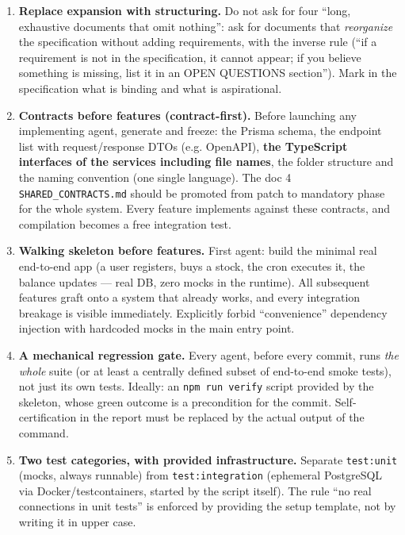 \documentclass[11pt,a4paper]{article}
\newcommand{\file}[1]{\texttt{\small #1}}
\begin{document}
\begin{enumerate}[leftmargin=1.8em]
  \item \textbf{Replace expansion with structuring.} Do not ask for four ``long, exhaustive documents that omit nothing'': ask for documents that \emph{reorganize} the specification without adding requirements, with the inverse rule (``if a requirement is not in the specification, it cannot appear; if you believe something is missing, list it in an OPEN QUESTIONS section''). Mark in the specification what is binding and what is aspirational.

  \item \textbf{Contracts before features (contract-first).} Before launching any implementing agent, generate and freeze: the Prisma schema, the endpoint list with request/response DTOs (e.g. OpenAPI), \textbf{the TypeScript interfaces of the services including file names}, the folder structure and the naming convention (one single language). The doc 4 \file{SHARED\_CONTRACTS.md} should be promoted from patch to mandatory phase for the whole system. Every feature implements against these contracts, and compilation becomes a free integration test.

  \item \textbf{Walking skeleton before features.} First agent: build the minimal real end-to-end app (a user registers, buys a stock, the cron executes it, the balance updates --- real DB, zero mocks in the runtime). All subsequent features graft onto a system that already works, and every integration breakage is visible immediately. Explicitly forbid ``convenience'' dependency injection with hardcoded mocks in the main entry point.

  \item \textbf{A mechanical regression gate.} Every agent, before every commit, runs \emph{the whole} suite (or at least a centrally defined subset of end-to-end smoke tests), not just its own tests. Ideally: an \file{npm run verify} script provided by the skeleton, whose green outcome is a precondition for the commit. Self-certification in the report must be replaced by the actual output of the command.

  \item \textbf{Two test categories, with provided infrastructure.} Separate \file{test:unit} (mocks, always runnable) from \file{test:integration} (ephemeral PostgreSQL via Docker/testcontainers, started by the script itself). The rule ``no real connections in unit tests'' is enforced by providing the setup template, not by writing it in upper case.


\end{enumerate}
\end{document}
